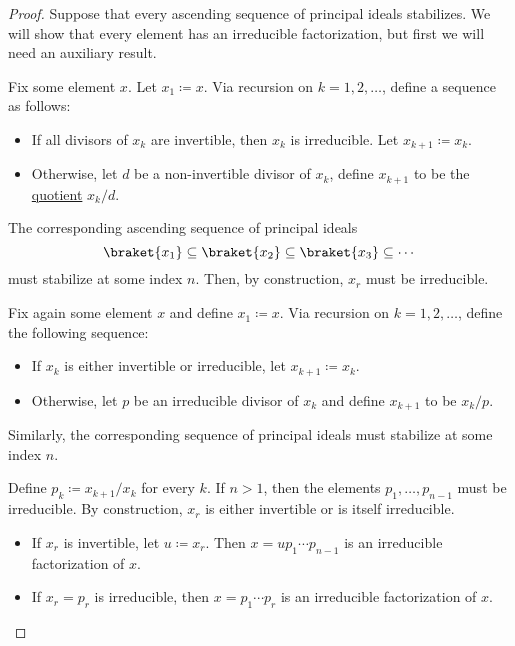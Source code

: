 \begin{proof}
   Suppose that every ascending sequence of principal ideals stabilizes. We will show that every element has an irreducible factorization, but first we will need an auxiliary result.

   Fix some element \( x \). Let \( x_1 \coloneqq x \). Via recursion on \( k = 1, 2, \ldots \), define a sequence as follows:
  \begin{itemize}
    \item If all divisors of \( x_k \) are invertible, then \( x_k \) is irreducible. Let \( x_{k+1} \coloneqq x_k \).
    \item Otherwise, let \( d \) be a non-invertible divisor of \( x_k \), define \( x_{k+1} \) to be the \hyperref[def:domain_quotient]{quotient} \( x_k / d \).
  \end{itemize}

  The corresponding ascending sequence of principal ideals
  \begin{equation*}
    \braket{ x_1 } \subseteq \braket{ x_2 } \subseteq \braket{ x_3 } \subseteq \cdots
  \end{equation*}
  must stabilize at some index \( n \). Then, by construction, \( x_r \) must be irreducible.

   Fix again some element \( x \) and define \( x_1 \coloneqq x \). Via recursion on \( k = 1, 2, \ldots \), define the following sequence:
  \begin{itemize}
    \item If \( x_k \) is either invertible or irreducible, let \( x_{k+1} \coloneqq x_k \).
    \item Otherwise, let \( p \) be an irreducible divisor of \( x_k \) and define \( x_{k+1} \) to be \( x_k / p \).
  \end{itemize}

  Similarly, the corresponding sequence of principal ideals must stabilize at some index \( n \).

  Define \( p_k \coloneqq x_{k+1} / x_k \) for every \( k \). If \( n > 1 \), then the elements \( p_1, \ldots, p_{n-1} \) must be irreducible. By construction, \( x_r \) is either invertible or is itself irreducible.
  \begin{itemize}
    \item If \( x_r \) is invertible, let \( u \coloneqq x_r \). Then \( x = u p_1 \cdots p_{n-1} \) is an irreducible factorization of \( x \).
    \item If \( x_r = p_r \) is irreducible, then \( x = p_1 \cdots p_r \) is an irreducible factorization of \( x \).
  \end{itemize}


\end{proof}
